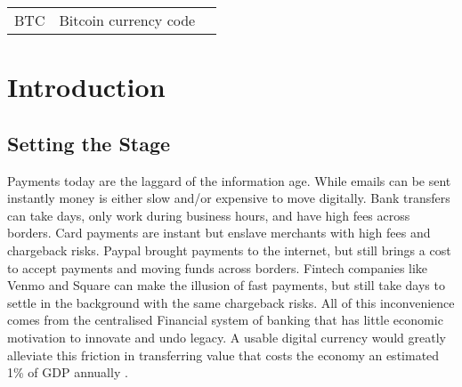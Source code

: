 \documentclass[12pt]{article} %
\begin{document}
\begin{tabular}{p{3 cm}ll} %
BTC & Bitcoin currency code
\end{tabular}


\pagebreak

\tableofcontents
\newpage

\listoffigures
\pagebreak

\listoftables
\pagebreak

\section{Introduction}
\label{Introduction}

\subsection{Setting the Stage}
Payments today are the laggard of the information age. While emails can be sent instantly money is either slow and/or expensive to move digitally. Bank transfers can take days, only work during business hours, and have high fees across borders. Card payments are instant but enslave merchants with high fees and chargeback risks. Paypal brought payments to the internet, but still brings a cost to accept payments and moving funds across borders. Fintech companies like Venmo and Square can make the illusion of fast payments, but still take days to settle in the background with the same chargeback risks. All of this inconvenience comes from the centralised Financial system of banking that has little economic motivation to innovate and undo legacy. A usable digital currency would greatly alleviate this friction in transferring value that costs the economy an estimated 1\% of GDP annually \cite{kaarmann2013cost}.
\end{document}
